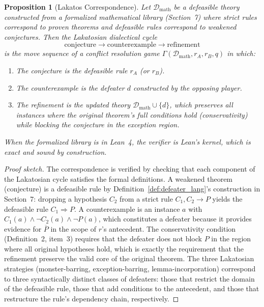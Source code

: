 \documentclass{article}
\newtheorem{proposition}{Proposition}
\newcommand{\D}{\mathcal{D}}
\newcommand{\defto}{\Rightarrow}
\newcommand{\strictto}{\rightarrow}
\newcommand{\comp}[1]{\overline{#1}}
\begin{document}
\begin{proposition}[Lakatos Correspondence]\label{prop:lakatos}
Let $\D_{\mathrm{math}}$ be a defeasible theory constructed from a formalized mathematical library (Section~7) where strict rules correspond to proven theorems and defeasible rules correspond to weakened conjectures. Then the Lakatosian dialectical cycle
\[
    \text{conjecture} \longrightarrow \text{counterexample} \longrightarrow \text{refinement}
\]
is the move sequence of a conflict resolution game $\Gamma(\D_{\mathrm{math}}, r_A, r_B, q)$ in which:
\begin{enumerate}[nosep]
    \item The conjecture is the defeasible rule $r_A$ (or $r_B$).
    \item The counterexample is the defeater $d$ constructed by the opposing player.
    \item The refinement is the updated theory $\D_{\mathrm{math}} \cup \{d\}$, which preserves all instances where the original theorem's full conditions hold (conservativity) while blocking the conjecture in the exception region.
\end{enumerate}
When the formalized library is in Lean~4, the verifier is Lean's kernel, which is exact and sound by construction.
\end{proposition}
 
\begin{proof}[Proof sketch]
The correspondence is verified by checking that each component of the Lakatosian cycle satisfies the formal definitions. A weakened theorem (conjecture) is a defeasible rule by Definition~\ref{def:defeater_lang}'s construction in Section~7: dropping a hypothesis $C_2$ from a strict rule $C_1, C_2 \strictto P$ yields the defeasible rule $C_1 \defto P$. A counterexample is an instance $a$ with $C_1(a) \wedge \neg C_2(a) \wedge \neg P(a)$, which constitutes a defeater because it provides evidence for $\comp{P}$ in the scope of $r$'s antecedent. The conservativity condition (Definition~2, item~3) requires that the defeater does not block $P$ in the region where all original hypotheses hold, which is exactly the requirement that the refinement preserve the valid core of the original theorem. The three Lakatosian strategies (monster-barring, exception-barring, lemma-incorporation) correspond to three syntactically distinct classes of defeaters: those that restrict the domain of the defeasible rule, those that add conditions to the antecedent, and those that restructure the rule's dependency chain, respectively.
\end{proof}
\end{document}
